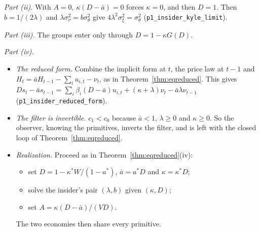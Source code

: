 \documentclass[12pt]{article}
\theoremstyle{definition}
\theoremstyle{remark}
\begin{document}
\emph{Part (ii).} With $A=0$, $\kappa(D-\bar a)=0$ forces $\kappa=0$, and then $D=1$. Then $b=1/(2\lambda)$ and $\lambda\sigma_\nu^2=b\sigma_\theta^2$ give $4\lambda^2\sigma_\xi^2=\sigma_\theta^2$ (\nolinkurl{p1_insider_kyle_limit}).

\emph{Part (iii).} The groups enter only through $D=1-\kappa G(D)$.

\emph{Part (iv).}
\begin{itemize}[itemsep=1pt,topsep=2pt]
\item \emph{The reduced form.} Combine the implicit form at $t$, the price law at $t-1$ and $H_t=\bar aH_{t-1}-\sum_iu_{i,t}-\nu_t$, as in Theorem~\ref{thm:eqreduced}. This gives $Ds_t-\bar as_{t-1}=\sum_i\beta_i(D-\bar a)u_{i,t}+(\kappa+\lambda)\nu_t-\bar a\lambda\nu_{t-1}$ (\nolinkurl{p1_insider_reduced_form}).
\item \emph{The filter is invertible.} $c_1<c_0$ because $\bar a<1$, $\lambda\ge0$ and $\kappa\ge0$. So the observer, knowing the primitives, inverts the filter, and is left with the closed loop of Theorem~\ref{thm:eqreduced}.
\item \emph{Realization.} Proceed as in Theorem~\ref{thm:eqreduced}(iv):
 \begin{itemize}[itemsep=1pt,topsep=2pt]
 \item set $D=1-\kappa^*W/(1-a^*)$, $\bar a=a^*D$ and $\kappa=\kappa^*D$;
 \item solve the insider's pair $(\lambda,b)$ given $(\kappa,D)$;
 \item set $A=\kappa(D-\bar a)/(VD)$.
 \end{itemize}
 The two economies then share every primitive.
\end{itemize}
\end{document}
